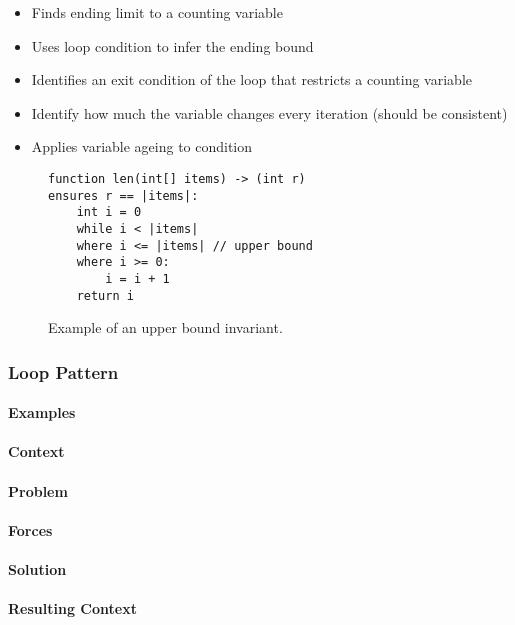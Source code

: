 
\begin{itemize}
	\item Finds ending limit to a counting variable
	\item Uses loop condition to infer the ending bound
	\item Identifies an exit condition of the loop that restricts a counting variable
	\item Identify how much the variable changes every iteration (should be consistent)
	\item Applies variable ageing to condition
\end{itemize}

\begin{figure}[ht]
\begin{lstlisting}
function len(int[] items) -> (int r)
ensures r == |items|:
    int i = 0
    while i < |items|
    where i <= |items| // upper bound
    where i >= 0:
        i = i + 1
    return i
\end{lstlisting}
\caption{Example of an upper bound invariant.}
\label{lst:upper-bound}
\end{figure}

\subsubsection{Loop Pattern}

\paragraph{Examples}
\paragraph{Context}
\paragraph{Problem}
\paragraph{Forces}
\paragraph{Solution}
\paragraph{Resulting Context}


